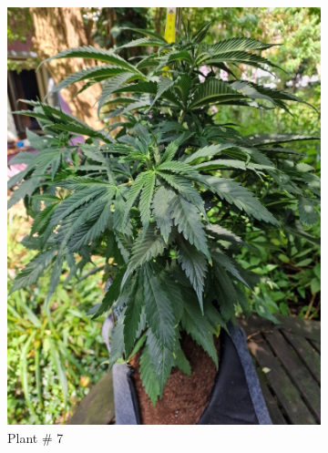 \begin{figure}[htbp]
\begin{subfigure}[t]{.28\textwidth}
        \includegraphics[width=\linewidth]{plant_07_2024-06-17}
        \caption{Plant \# 7}
        \label{fig:plant_07_2024-06-17}
    \end{subfigure}
    \begin{subfigure}[t]{.28\textwidth}

\end{subfigure}
\end{figure}
